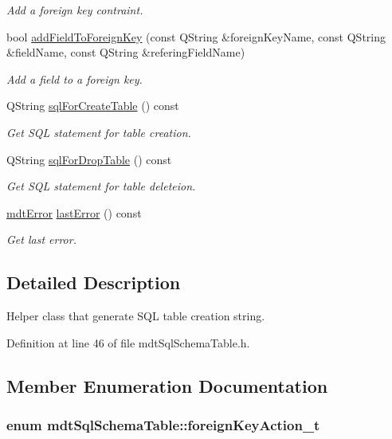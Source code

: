 \begin{DoxyCompactItemize}
\begin{DoxyCompactList}\small\item\em Add a foreign key contraint. \end{DoxyCompactList}\item 
bool \hyperlink{classmdt_sql_schema_table_a0909cc0e3ad602312ddf44de397d9fe4}{add\-Field\-To\-Foreign\-Key} (const Q\-String \&foreign\-Key\-Name, const Q\-String \&field\-Name, const Q\-String \&refering\-Field\-Name)
\begin{DoxyCompactList}\small\item\em Add a field to a foreign key. \end{DoxyCompactList}\item 
Q\-String \hyperlink{classmdt_sql_schema_table_a8a072145d85a6a2c183e01aaa6d91a5d}{sql\-For\-Create\-Table} () const 
\begin{DoxyCompactList}\small\item\em Get S\-Q\-L statement for table creation. \end{DoxyCompactList}\item 
Q\-String \hyperlink{classmdt_sql_schema_table_a35fd4ed657f48013747973fef78be345}{sql\-For\-Drop\-Table} () const 
\begin{DoxyCompactList}\small\item\em Get S\-Q\-L statement for table deleteion. \end{DoxyCompactList}\item 
\hyperlink{classmdt_error}{mdt\-Error} \hyperlink{classmdt_sql_schema_table_a8199d144499e7fd77ad168049a3c2ca7}{last\-Error} () const 
\begin{DoxyCompactList}\small\item\em Get last error. \end{DoxyCompactList}\end{DoxyCompactItemize}


\subsection{Detailed Description}
Helper class that generate S\-Q\-L table creation string. 

Definition at line 46 of file mdt\-Sql\-Schema\-Table.\-h.



\subsection{Member Enumeration Documentation}
\hypertarget{classmdt_sql_schema_table_a1738e443f03dc69b914edb967cb911be}{
\subsubsection[{foreign\-Key\-Action\-\_\-t}]{\setlength{\rightskip}{0pt plus 5cm}enum {\bf mdt\-Sql\-Schema\-Table\-::foreign\-Key\-Action\-\_\-t}}}\label{classmdt_sql_schema_table_a1738e443f03dc69b914edb967cb911be}


